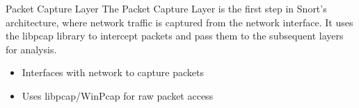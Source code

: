 \begin{frame}[t]{Packet Capture Layer}
  \fontsize{17}{20.5}\selectfont
  \vspace{0.1cm}
  The Packet Capture Layer is the first step in Snort's architecture, where network traffic is captured from the network interface. It uses the libpcap library to intercept packets and pass them to the subsequent layers for analysis.
  \vspace{0.15cm}
  \begin{itemize}
    \item \textcolor{WarningColor}{Interfaces} with network to capture packets
    \item Uses \textcolor{WarningColor}{libpcap/WinPcap} for raw packet access
  \end{itemize}
\end{frame}

